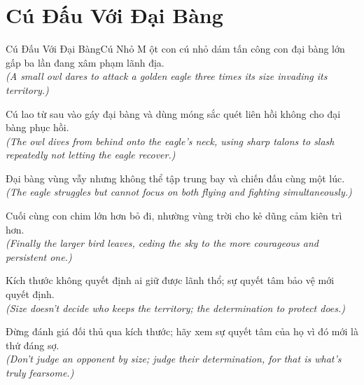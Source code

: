 \section{Cú Đấu Với Đại Bàng}
\begin{truyen}{Cú Đấu Với Đại Bàng}{Cú Nhỏ}
M ột con cú nhỏ dám tấn công con đại bàng lớn gấp ba lần đang xâm phạm lãnh địa.\\
\textit{(A small owl dares to attack a golden eagle three times its size invading its territory.)}

Cú lao từ sau vào gáy đại bàng và dùng móng sắc quét liên hồi không cho đại bàng phục hồi.\\
\textit{(The owl dives from behind onto the eagle's neck, using sharp talons to slash repeatedly not letting the eagle recover.)}

Đại bàng vùng vẫy nhưng không thể tập trung bay và chiến đấu cùng một lúc.\\
\textit{(The eagle struggles but cannot focus on both flying and fighting simultaneously.)}

Cuối cùng con chim lớn hơn bỏ đi, nhường vùng trời cho kẻ dũng cảm kiên trì hơn.\\
\textit{(Finally the larger bird leaves, ceding the sky to the more courageous and persistent one.)}

Kích thước không quyết định ai giữ được lãnh thổ; sự quyết tâm bảo vệ mới quyết định.\\
\textit{(Size doesn't decide who keeps the territory; the determination to protect does.)}

\end{truyen}
\begin{baihoc}
  Đừng đánh giá đối thủ qua kích thước; hãy xem sự quyết tâm của họ vì đó mới là thứ đáng sợ.\\
  \textit{(Don't judge an opponent by size; judge their determination, for that is what's truly fearsome.)}
\end{baihoc}

